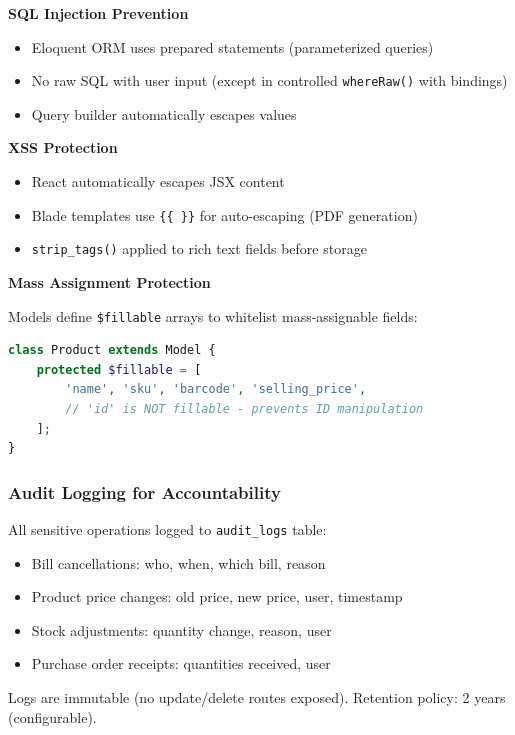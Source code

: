 \textbf{SQL Injection Prevention}

\begin{itemize}
    \item Eloquent ORM uses prepared statements (parameterized queries)
    \item No raw SQL with user input (except in controlled \texttt{whereRaw()} with bindings)
    \item Query builder automatically escapes values
\end{itemize}

\textbf{XSS Protection}

\begin{itemize}
    \item React automatically escapes JSX content
    \item Blade templates use \texttt{\{\{ \}\}} for auto-escaping (PDF generation)
    \item \texttt{strip\_tags()} applied to rich text fields before storage
\end{itemize}

\textbf{Mass Assignment Protection}

Models define \texttt{\$fillable} arrays to whitelist mass-assignable fields:

\begin{lstlisting}[language=PHP]
class Product extends Model {
    protected $fillable = [
        'name', 'sku', 'barcode', 'selling_price',
        // 'id' is NOT fillable - prevents ID manipulation
    ];
}
\end{lstlisting}

\subsubsection{Audit Logging for Accountability}

All sensitive operations logged to \texttt{audit\_logs} table:

\begin{itemize}
    \item Bill cancellations: who, when, which bill, reason
    \item Product price changes: old price, new price, user, timestamp
    \item Stock adjustments: quantity change, reason, user
    \item Purchase order receipts: quantities received, user
\end{itemize}

Logs are immutable (no update/delete routes exposed). Retention policy: 2 years (configurable).

